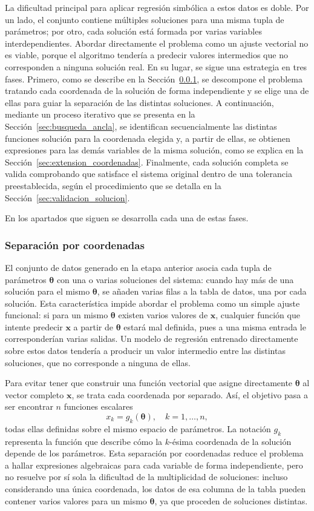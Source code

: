 \documentclass[12pt,a4paper]{article} \usepackage[utf8]{inputenc} \usepackage[spanish]{babel} \usepackage{amsmath, amssymb, amsthm} \usepackage{bm} \usepackage{float} \usepackage{longtable} \usepackage[hidelinks]{hyperref}
\newcommand{\xvec}{\mathbf{x}} \newcommand{\thetavec}{\boldsymbol{\theta}} \newcommand{\Fvec}{\mathbf{F}} \newcommand{\R}{\mathbb{R}} \newcommand{\norm}[1]{\left\lVert#1\right\rVert} \newcommand{\loss}{\mathcal{L}} \newcommand{\dataset}{\mathcal{D}} \newcommand{\jac}{\mathbf{J}}
\begin{document}
La dificultad principal para aplicar regresión simbólica a estos datos
es doble. Por un lado, el conjunto contiene múltiples soluciones para
una misma tupla de parámetros; por otro, cada solución está formada por
varias variables interdependientes. Abordar directamente el problema
como un ajuste vectorial no es viable, porque el algoritmo tendería a
predecir valores intermedios que no corresponden a ninguna solución
real. En su lugar, se sigue una estrategia en tres fases. Primero, como
se describe en la Sección~\ref{sec:desacoplamiento}, se descompone el
problema tratando cada coordenada de la solución de forma independiente
y se elige una de ellas para guiar la separación de las distintas
soluciones. A continuación, mediante un proceso iterativo que se
presenta en la Sección~\ref{sec:busqueda_ancla}, se identifican
secuencialmente las distintas funciones solución para la coordenada
elegida y, a partir de ellas, se obtienen expresiones para las demás
variables de la misma solución, como se explica en la
Sección~\ref{sec:extension_coordenadas}. Finalmente, cada solución
completa se valida comprobando que satisface el sistema original dentro
de una tolerancia preestablecida, según el procedimiento que se detalla
en la Sección~\ref{sec:validacion_solucion}.

En los apartados que siguen se desarrolla cada una de estas fases.

\subsubsection{Separación por coordenadas}
\label{sec:desacoplamiento}

El conjunto de datos generado en la etapa anterior asocia cada tupla de
parámetros \(\thetavec\) con una o varias soluciones del sistema:
cuando hay más de una solución para el mismo \(\thetavec\), se añaden
varias filas a la tabla de datos, una por cada solución. Esta
característica impide abordar el problema como un simple ajuste
funcional: si para un mismo \(\thetavec\) existen varios valores de
\(\xvec\), cualquier función que intente predecir \(\xvec\) a partir de
\(\thetavec\) estará mal definida, pues a una misma entrada le
corresponderían varias salidas. Un modelo de regresión entrenado
directamente sobre estos datos tendería a producir un valor intermedio
entre las distintas soluciones, que no corresponde a ninguna de ellas.

Para evitar tener que construir una función vectorial que asigne
directamente \(\thetavec\) al vector completo \(\xvec\), se trata cada
coordenada por separado. Así, el objetivo pasa a ser encontrar \(n\)
funciones escalares
\[
x_k = g_k(\thetavec), \quad k = 1, \dots, n,
\]
todas ellas definidas sobre el mismo espacio de parámetros. La notación
\(g_k\) representa la función que describe cómo la \(k\)-ésima
coordenada de la solución depende de los parámetros. Esta separación
por coordenadas reduce el problema a hallar expresiones algebraicas
para cada variable de forma independiente, pero no resuelve por sí sola
la dificultad de la multiplicidad de soluciones: incluso considerando
una única coordenada, los datos de esa columna de la tabla pueden
contener varios valores para un mismo \(\thetavec\), ya que proceden de
soluciones distintas.
\end{document}
